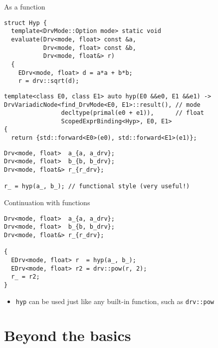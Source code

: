 \documentclass[xcolor=dvipsnames]{beamer}
\begin{document}
\begin{frame}[fragile]{As a function}
\begin{lstlisting}
struct Hyp {
  template<DrvMode::Option mode> static void
  evaluate(Drv<mode, float> const &a,
           Drv<mode, float> const &b,
           Drv<mode, float&> r)
  {
    EDrv<mode, float> d = a*a + b*b;
    r = drv::sqrt(d);
\end{lstlisting}

\begin{lstlisting}
template<class E0, class E1> auto hyp(E0 &&e0, E1 &&e1) ->
DrvVariadicNode<find_DrvMode<E0, E1>::result(), // mode
                decltype(primal(e0 + e1)),      // float
                ScopedExprBinding<Hyp>, E0, E1>
{
  return {std::forward<E0>(e0), std::forward<E1>(e1)};
\end{lstlisting}

\begin{lstlisting}
Drv<mode, float>  a_{a, a_drv};
Drv<mode, float>  b_{b, b_drv};
Drv<mode, float&> r_{r_drv};

r_ = hyp(a_, b_); // functional style (very useful!)
\end{lstlisting}
\end{frame}


\begin{frame}[fragile]{Continuation with functions}
\begin{lstlisting}
Drv<mode, float>  a_{a, a_drv};
Drv<mode, float>  b_{b, b_drv};
Drv<mode, float&> r_{r_drv};

{
  EDrv<mode, float> r  = hyp(a_, b_);
  EDrv<mode, float> r2 = drv::pow(r, 2);
  r_ = r2;
}
\end{lstlisting}

\begin{itemize}
\item {\color{red}\texttt{hyp}} can be used just like any built-in function, such as \texttt{{\color{blue}drv}::pow}
\end{itemize}
\end{frame}


\section{Beyond the basics}
\end{document}
